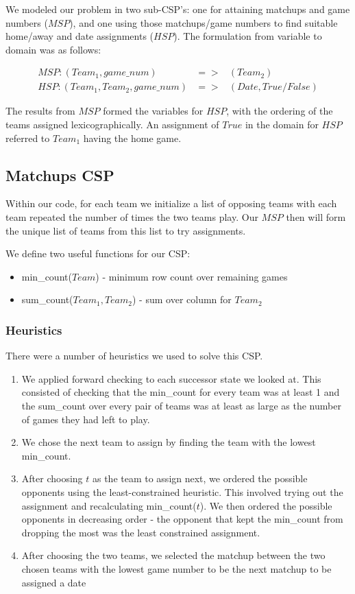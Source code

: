 \documentclass{article}
\begin{document}
	We modeled our problem in two sub-CSP's: one for attaining matchups and game numbers ($MSP$), and one using those matchups/game numbers to find suitable home/away and date assignments ($HSP$). The formulation from variable to domain was as follows:

	\begin{eqnarray*}
		MSP: (Team_1, game\_num) &=>& (Team_2) \\
		HSP: (Team_1, Team_2, game\_num) &=>& (Date, True/False)
	\end{eqnarray*}

	The results from $MSP$ formed the variables for $HSP$, with the ordering of the teams assigned lexicographically. An assignment of $True$ in the domain for $HSP$ referred to $Team_1$ having the home game.

	\subsection{Matchups CSP}
	Within our code, for each team we initialize a list of opposing teams with each team repeated the number of times the two teams play. Our $MSP$ then will form the unique list of teams from this list to try assignments.

	We define two useful functions for our CSP:
	\begin{itemize}
		\item min\_count($Team$) - minimum row count over remaining games
		\item sum\_count($Team_1, Team_2$) - sum over column for $Team_2$
	\end{itemize}

	\subsubsection{Heuristics}
	There were a number of heuristics we used to solve this CSP.
	\begin{enumerate}
		\item We applied forward checking to each successor state we looked at. This consisted of checking that the min\_count for every team was at least 1 and the sum\_count over every pair of teams was at least as large as the number of games they had left to play.
		\item We chose the next team to assign by finding the team with the lowest min\_count.
		\item After choosing $t$ as the team to assign next, we ordered the possible opponents using the least-constrained heuristic. This involved trying out the assignment and recalculating min\_count($t$). We then ordered the possible opponents in decreasing order - the opponent that kept the min\_count from dropping the most was the least constrained assignment.
		\item After choosing the two teams, we selected the matchup between the two chosen teams with the lowest game number to be the next matchup to be assigned a date
	\end{enumerate}
\end{document}

